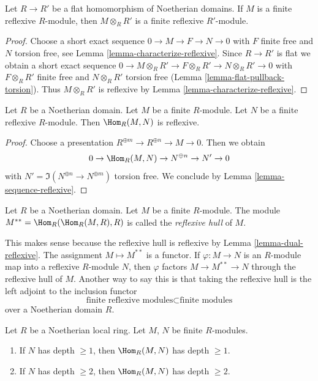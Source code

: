 \begin{lemma}
\label{lemma-flat-pullback-reflexive}
Let $R \to R'$ be a flat homomorphism of Noetherian domains.
If $M$ is a finite reflexive $R$-module, then $M \otimes_R R'$
is a finite reflexive $R'$-module.
\end{lemma}

\begin{proof}
Choose a short exact sequence $0 \to M \to F \to N \to 0$
with $F$ finite free and $N$ torsion free, see
Lemma \ref{lemma-characterize-reflexive}. Since $R \to R'$ is flat
we obtain a short exact sequence
$0 \to M \otimes_R R' \to F \otimes_R R' \to N \otimes_R R' \to 0$
with $F \otimes_R R'$ finite free and $N \otimes_R R'$ torsion
free (Lemma \ref{lemma-flat-pullback-torsion}). Thus $M \otimes_R R'$
is reflexive by Lemma \ref{lemma-characterize-reflexive}.
\end{proof}

\begin{lemma}
\label{lemma-dual-reflexive}
Let $R$ be a Noetherian domain. Let $M$ be a finite $R$-module.
Let $N$ be a finite reflexive $R$-module. Then $\Hom_R(M, N)$ is reflexive.
\end{lemma}

\begin{proof}
Choose a presentation $R^{\oplus m} \to R^{\oplus n} \to M \to 0$.
Then we obtain
$$
0 \to \Hom_R(M, N) \to N^{\oplus n} \to N' \to 0
$$
with $N' = \Im(N^{\oplus n} \to N^{\oplus m})$ torsion free.
We conclude by Lemma \ref{lemma-sequence-reflexive}.
\end{proof}

\begin{definition}
\label{definition-reflexive-hull}
Let $R$ be a Noetherian domain. Let $M$ be a finite $R$-module.
The module $M^{**} = \Hom_R(\Hom_R(M, R), R)$ is called the
{\it reflexive hull} of $M$.
\end{definition}

\noindent
This makes sense because the reflexive hull is reflexive by
Lemma \ref{lemma-dual-reflexive}. The assignment $M \mapsto M^{**}$
is a functor. If $\varphi : M \to N$ is an $R$-module map into a reflexive
$R$-module $N$, then $\varphi$ factors $M \to M^{**} \to N$
through the reflexive hull of $M$. Another way to say this is that
taking the reflexive hull is the left adjoint to the inclusion functor
$$
\text{finite reflexive modules} \subset
\text{finite modules}
$$
over a Noetherian domain $R$.

\begin{lemma}
\label{lemma-hom-into-depth}
Let $R$ be a Noetherian local ring. Let $M$, $N$ be finite $R$-modules.
\begin{enumerate}
\item If $N$ has depth $\geq 1$, then $\Hom_R(M, N)$ has depth $\geq 1$.
\item If $N$ has depth $\geq 2$, then $\Hom_R(M, N)$ has depth $\geq 2$.
\end{enumerate}
\end{lemma}

